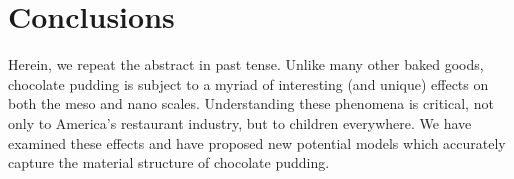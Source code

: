 \documentclass{ccr15}
\begin{document}
\section{Conclusions}
Herein, we repeat the abstract in past tense.
Unlike many other baked goods, chocolate pudding is subject to a myriad of interesting (and unique) effects on both the
meso and nano scales. Understanding these phenomena is critical, not only to America's restaurant industry, but to
children everywhere. We have examined these effects and have proposed new potential models which accurately capture
the material structure of chocolate pudding.

\nocite{ZAB:Mentor05}

%
\end{document}
